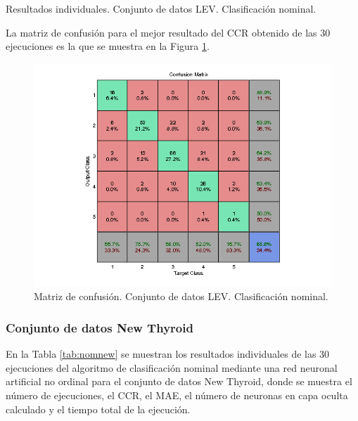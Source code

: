 			\begin{table}[!htbp]
				\centering
				\caption{Resultados individuales. Conjunto de datos LEV. Clasificación nominal.}
				\label{tab:nomlev}
			\end{table}
			
			La matriz de confusión para el mejor resultado del CCR obtenido de las 30 ejecuciones es la que se muestra en la Figura \ref{fig:nomlev}.
			
			\begin{figure}[htbp]
				\centering
				\includegraphics[scale=0.8]{../src/results/nominal/LEV_mc28.png}
				\caption{Matriz de confusión. Conjunto de datos LEV. Clasificación nominal.}
				\label{fig:nomlev}
			\end{figure}

			\subsubsection{Conjunto de datos New Thyroid}
			
			En la Tabla \ref{tab:nomnew} se muestran los resultados individuales de las 30 ejecuciones del algoritmo de clasificación nominal mediante una red neuronal artificial no ordinal para el conjunto de datos New Thyroid, donde se muestra el número de ejecuciones, el CCR, el MAE, el número de neuronas en capa oculta calculado y el tiempo total de la ejecución.\\
			
